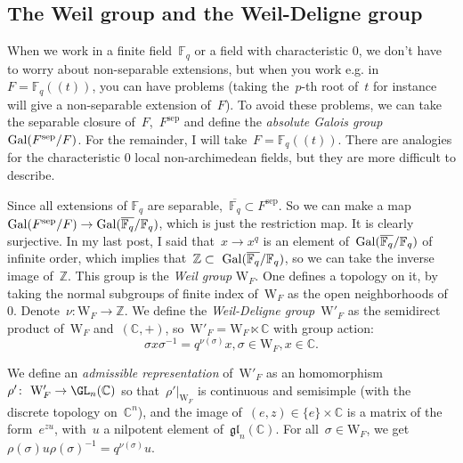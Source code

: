 \subsection{The Weil group and the Weil-Deligne group}
When we work in a finite field~$\mathbb{F}_q$ or a field with characteristic 0, we don't have to worry about non-separable extensions, but when you work e.g. in~$F = \mathbb{F}_q (\!(t)\!)$, you can have problems (taking the~$p$-th root of~$t$ for instance will give a non-separable extension of~$F$). To avoid these problems, we can take the separable closure of~$F$,~$F^{\textrm{sep}}$ and define the \emph{absolute Galois group} $\operatorname{Gal}(F^{\textrm{sep}}/F)$. For the remainder, I will take~$F = \mathbb{F}_q (\!(t)\!)$. There are analogies for the characteristic 0 local non-archimedean fields, but they are more difficult to describe.

Since all extensions of $\mathbb{F}_q$ are separable,~$\overline{ \mathbb{F}_q} \subset F^{\textrm{sep}}$. So we can make a map~$\operatorname{Gal}(F^{\textrm{sep}}/F) \rightarrow \operatorname{Gal}(\overline{ \mathbb{F}_q} /\mathbb{F}_q)$, which is just the restriction map. It is clearly surjective. In my last post, I said that~$x \rightarrow x^q$ is an element of~$\operatorname{Gal}(\overline{ \mathbb{F}_q} /\mathbb{F}_q)$ of infinite order, which implies that~$\mathbb{Z} \subset \Gal(\overline{ \mathbb{F}_q} /\mathbb{F}_q)$, so we can take the inverse image of~$\mathbb{Z}$. This group is the \emph{Weil group} $\mathrm{W}_F$. One defines a topology on it, by taking the normal subgroups of finite index of~$\mathrm{W}_F$ as the open neighborhoods of~$0$. Denote~$\nu\colon\mathrm{W}_F \rightarrow \mathbb{Z}$. We define the \emph{Weil-Deligne group}~$\mathrm{W}'_F$ as the semidirect product of~$\mathrm{W}_F$ and~$(\mathbb{C},+)$, so~$\mathrm{W}'_F = \mathrm{W}_F \ltimes \mathbb{C}$ with group action:
\begin{equation}
  \sigma x \sigma^{-1} = q^{\nu(\sigma)}x, \sigma \in \mathrm{W}_F, x \in \mathbb{C}.
\end{equation}

We define an \emph{admissible representation} of~$\mathrm{W}'_F$ as an homomorphism~$\rho'\colon \mathrm{W}'_F \rightarrow \GL_n(\mathbb{C})$ so that~$\rho'|_{\mathrm{W}_F}$ is continuous and semisimple (with the discrete topology on~$\mathbb{C}^n$), and the image of~$(e,z) \in \{e\}\times\mathbb{C}$ is a matrix of the form~$e^{zu}$, with~$u$ a nilpotent element of~$\mathfrak{gl}_n(\mathbb{C})$. For all~$\sigma \in \mathrm{W}_F$, we get~$\rho(\sigma)u\rho(\sigma)^{-1} = q^{\nu(\sigma)}u$.

